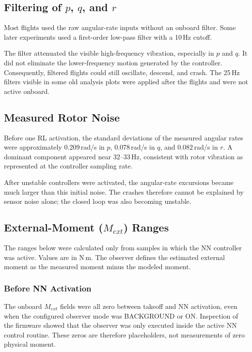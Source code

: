 \documentclass[11pt,a4paper]{article}
\begin{document}
\subsection{Filtering of \texorpdfstring{$p$, $q$, and $r$}{p, q, and r}}

Most flights used the raw angular-rate inputs without an onboard filter. Some later experiments used a first-order low-pass filter with a 10\,Hz cutoff.

The filter attenuated the visible high-frequency vibration, especially in $p$ and $q$. It did not eliminate the lower-frequency motion generated by the controller. Consequently, filtered flights could still oscillate, descend, and crash. The 25\,Hz filters visible in some old analysis plots were applied after the flights and were not active onboard.

\subsection{Measured Rotor Noise}

Before one RL activation, the standard deviations of the measured angular rates were approximately 0.209\,rad/s in $p$, 0.078\,rad/s in $q$, and 0.082\,rad/s in $r$. A dominant component appeared near 32--33\,Hz, consistent with rotor vibration as represented at the controller sampling rate.

After unstable controllers were activated, the angular-rate excursions became much larger than this initial noise. The crashes therefore cannot be explained by sensor noise alone; the closed loop was also becoming unstable.

\subsection{External-Moment (\texorpdfstring{$M_{ext}$}{Mext}) Ranges}

The ranges below were calculated only from samples in which the NN controller was active. Values are in N\,m. The observer defines the estimated external moment as the measured moment minus the modeled moment.

\subsubsection{Before NN Activation}

The onboard $M_{ext}$ fields were all zero between takeoff and NN activation, even when the configured observer mode was BACKGROUND or ON. Inspection of the firmware showed that the observer was only executed inside the active NN control routine. These zeros are therefore placeholders, not measurements of zero physical moment.
\end{document}
